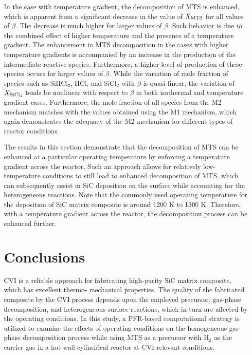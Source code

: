 \documentclass[final, letterpaper, square, comma, numbers, sort&compress]{elsarticle}
\begin{document}
In the case with temperature gradient, the decomposition of MTS is enhanced, which is apparent from a significant decrease in the value of $X_{\rm MTS}$ for all values of $\beta$. The decrease is much higher for larger values of $\beta$. Such behavior is due to the combined effect of higher temperature and the presence of a temperature gradient. The enhancement in MTS decomposition in the cases with higher temperature gradients is accompanied by an increase in the production of the intermediate reactive species. Furthermore, a higher level of production of these species occurs for larger values of $\beta$. While the variation of mole fraction of species such as SiHCl$_3$, HCl, and SiCl$_2$ with $\beta$ is quasi-linear, the variation of $X_{\rm SiCl_4}$ tends be nonlinear with respect to $\beta$ in both isothermal and temperature gradient cases. Furthermore, the mole fraction of all species from the M2 mechanism matches with the values obtained using the M1 mechanism, which again demonstrates the adequacy of the M2 mechanism for different types of reactor conditions.

The results in this section demonstrate that the decomposition of MTS can be enhanced at a particular operating temperature by enforcing a temperature gradient across the reactor. Such an approach allows for relatively low-temperature conditions to still lead to enhanced decomposition of MTS, which can subsequently assist in SiC deposition on the surface while accounting for the heterogeneous reactions. Note that the commonly used operating temperature for the deposition of SiC matrix composite is around 1200 K to 1300 K. Therefore, with a temperature gradient across the reactor, the decomposition process can be enhanced further.

\section{Conclusions}
CVI is a reliable approach for fabricating high-purity SiC matrix composite, which has excellent thermo- mechanical properties. The quality of the fabricated composite by the CVI process depends upon the employed precursor, gas-phase decomposition, and heterogeneous surface reactions, which in turn are affected by the operating conditions. In this study, a PFR-based computational strategy is utilized to examine the effects of operating conditions on the homogeneous gas-phase decomposition process while using MTS as a precursor with H$_2$ as the carrier gas in a hot-wall cylindrical reactor at CVI-relevant conditions.
\end{document}
